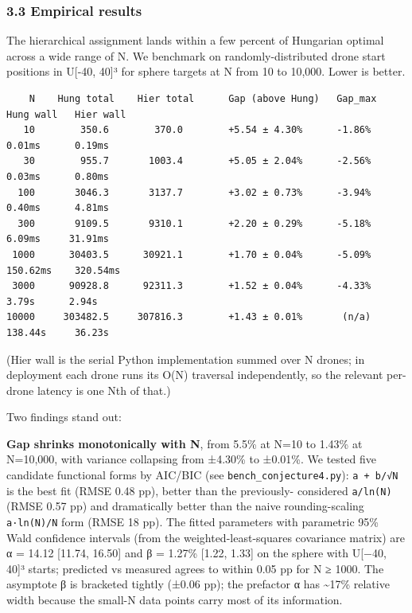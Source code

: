 \subsubsection{3.3 Empirical results}\label{empirical-results}

The hierarchical assignment lands within a few percent of Hungarian
optimal across a wide range of N. We benchmark on randomly-distributed
drone start positions in U{[}-40, 40{]}³ for sphere targets at N from 10
to 10,000. Lower is better.

\begin{verbatim}
    N    Hung total    Hier total      Gap (above Hung)   Gap_max    Hung wall   Hier wall
   10        350.6        370.0        +5.54 ± 4.30%      -1.86%      0.01ms      0.19ms
   30        955.7       1003.4        +5.05 ± 2.04%      -2.56%      0.03ms      0.80ms
  100       3046.3       3137.7        +3.02 ± 0.73%      -3.94%      0.40ms      4.81ms
  300       9109.5       9310.1        +2.20 ± 0.29%      -5.18%      6.09ms     31.91ms
 1000      30403.5      30921.1        +1.70 ± 0.04%      -5.09%    150.62ms    320.54ms
 3000      90928.8      92311.3        +1.52 ± 0.04%      -4.33%      3.79s      2.94s
10000     303482.5     307816.3        +1.43 ± 0.01%       (n/a)    138.44s     36.23s
\end{verbatim}

(Hier wall is the serial Python implementation summed over N drones; in
deployment each drone runs its O(N) traversal independently, so the
relevant per-drone latency is one Nth of that.)

Two findings stand out:

\textbf{Gap shrinks monotonically with N}, from 5.5\% at N=10 to 1.43\%
at N=10,000, with variance collapsing from ±4.30\% to ±0.01\%. We tested
five candidate functional forms by AIC/BIC (see
\texttt{bench\_conjecture4.py}): \texttt{a\ +\ b/√N} is the best fit
(RMSE 0.48 pp), better than the previously- considered \texttt{a/ln(N)}
(RMSE 0.57 pp) and dramatically better than the naive rounding-scaling
\texttt{a·ln(N)/N} form (RMSE 18 pp). The fitted parameters with
parametric 95\% Wald confidence intervals (from the
weighted-least-squares covariance matrix) are α = 14.12 {[}11.74,
16.50{]} and β = 1.27\% {[}1.22, 1.33{]} on the sphere with U{[}−40,
40{]}³ starts; predicted vs measured agrees to within 0.05 pp for N ≥
1000. The asymptote β is bracketed tightly (±0.06 pp); the prefactor α
has \textasciitilde17\% relative width because the small-N data points
carry most of its information.

